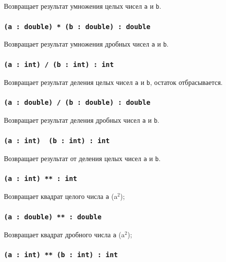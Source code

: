 Возвращает результат умножения целых чисел \texttt{a} и \texttt{b}.

\subsubsection{\texttt{(a : double) * (b : double) : double}}

Возвращает результат умножения дробных чисел \texttt{a} и \texttt{b}.

\subsubsection{\texttt{(a : int) / (b : int) : int}}

Возвращает результат деления целых чисел \texttt{a} и \texttt{b}, остаток отбрасывается.

\subsubsection{\texttt{(a : double) / (b : double) : double}}

Возвращает результат деления дробных чисел \texttt{a} и \texttt{b}.

\subsubsection{\texttt{(a : int) \ (b : int) : int}}

Возвращает результат от деления целых чисел \texttt{a} и \texttt{b}.


\subsubsection{\texttt{(a : int) ** : int}}

Возвращает квадрат целого числа \texttt{a} (a$^2$);

\subsubsection{\texttt{(a : double) ** : double}}

Возвращает квадрат дробного числа \texttt{a} (a$^2$);

\subsubsection{\texttt{(a : int) ** (b : int) : int}}

